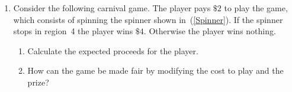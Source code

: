 \documentclass[12pt]{article}
\begin{document}
\begin{enumerate}
\item Consider the following carnival game.
The player pays $\$2$ to play the game, which
consists of spinning the spinner
shown in~(\ref{Spinner}). If the spinner stops in region~4
the player wins $\$4$. Otherwise the player wins nothing.
\begin{enumerate}
\item Calculate the expected proceeds for the player.
\item How can the game be made fair by modifying the
cost to play and the prize?
\end{enumerate}
\end{enumerate}
\end{document}
